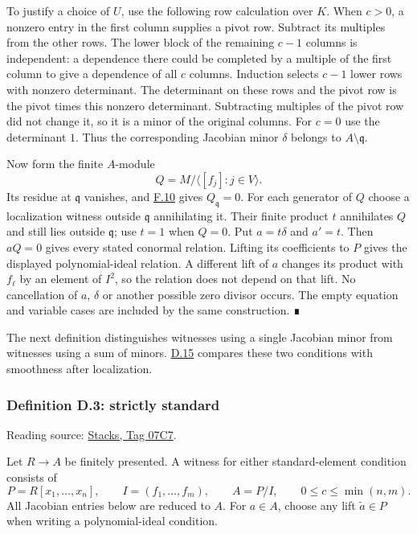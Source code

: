 \documentclass[11pt,a4paper,openany]{report}
\begin{document}
To justify a choice of \(U\), use the following row calculation over \(K\). When \(c>0\), a nonzero entry in the first column supplies a pivot row. Subtract its multiples from the other rows. The lower block of the remaining \(c-1\) columns is independent: a dependence there could be completed by a multiple of the first column to give a dependence of all \(c\) columns. Induction selects \(c-1\) lower rows with nonzero determinant. The determinant on these rows and the pivot row is the pivot times this nonzero determinant. Subtracting multiples of the pivot row did not change it, so it is a minor of the original columns. For \(c=0\) use the determinant \(1\). Thus the corresponding Jacobian minor \(\delta\) belongs to \(A\setminus\mathfrak q\).

Now form the finite \(A\)-module \[Q=M/\langle[f_j]:j\in V\rangle.\] Its residue at \(\mathfrak q\) vanishes, and \hyperref[AG-RG-S05-algebra-lemma-NAK]{F.10} gives \(Q_{\mathfrak q}=0\). For each generator of \(Q\) choose a localization witness outside \(\mathfrak q\) annihilating it. Their finite product \(t\) annihilates \(Q\) and still lies outside \(\mathfrak q\); use \(t=1\) when \(Q=0\). Put \(a=t\delta\) and \(a'=t\). Then \(aQ=0\) gives every stated conormal relation. Lifting its coefficients to \(P\) gives the displayed polynomial-ideal relation. A different lift of \(a\) changes its product with \(f_\ell\) by an element of \(I^2\), so the relation does not depend on that lift. No cancellation of \(a\), \(\delta\) or another possible zero divisor occurs. The empty equation and variable cases are included by the same construction. ∎

The next definition distinguishes witnesses using a single Jacobian minor from witnesses using a sum of minors. \hyperref[AG-RG-S05-smoothing-lemma-compare-standard]{D.15} compares these two conditions with smoothness after localization.

\label{AG-RG-S05-smoothing-definition-strictly-standard}

\subsubsection{Definition D.3: strictly standard}\label{AG-RG-S05-definition-d.3-strictly-standard}

Reading source: \href{https://stacks.math.columbia.edu/tag/07C7}{Stacks, Tag 07C7}.

Let \(R\to A\) be finitely presented. A witness for either standard-element condition consists of \[P=R[x_1,\ldots,x_n],\qquad I=(f_1,\ldots,f_m),\qquad A=P/I,\qquad 0\leq c\leq\min(n,m).\] All Jacobian entries below are reduced to \(A\). For \(a\in A\), choose any lift \(\widetilde a\in P\) when writing a polynomial-ideal condition.
\end{document}
